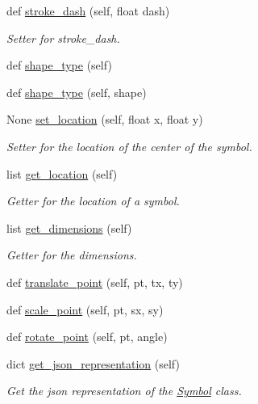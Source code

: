 \begin{DoxyCompactItemize}
def \mbox{\hyperlink{classbridges_1_1symbol_1_1_symbol_a78470b4fe73aea2cf7f5b7ad02eb2776}{stroke\+\_\+dash}} (self, float dash)
\begin{DoxyCompactList}\small\item\em Setter for stroke\+\_\+dash. \end{DoxyCompactList}\item 
def \mbox{\hyperlink{classbridges_1_1symbol_1_1_symbol_a86813f0f1a7ecbe5c52725730c887e75}{shape\+\_\+type}} (self)
\item 
def \mbox{\hyperlink{classbridges_1_1symbol_1_1_symbol_aea966b54a55c137ec15e849829fc9be9}{shape\+\_\+type}} (self, shape)
\item 
None \mbox{\hyperlink{classbridges_1_1symbol_1_1_symbol_a353bd462db1773ebe1e9a888f91d6ea5}{set\+\_\+location}} (self, float x, float y)
\begin{DoxyCompactList}\small\item\em Setter for the location of the center of the symbol. \end{DoxyCompactList}\item 
list \mbox{\hyperlink{classbridges_1_1symbol_1_1_symbol_ab7bf7c5d243838d4f018fae10fe88259}{get\+\_\+location}} (self)
\begin{DoxyCompactList}\small\item\em Getter for the location of a symbol. \end{DoxyCompactList}\item 
list \mbox{\hyperlink{classbridges_1_1symbol_1_1_symbol_a18aa1240a141ec2621322e37471eae30}{get\+\_\+dimensions}} (self)
\begin{DoxyCompactList}\small\item\em Getter for the dimensions. \end{DoxyCompactList}\item 
def \mbox{\hyperlink{classbridges_1_1symbol_1_1_symbol_a9600a66f48ad38baf42a2043db13334b}{translate\+\_\+point}} (self, pt, tx, ty)
\item 
def \mbox{\hyperlink{classbridges_1_1symbol_1_1_symbol_a963b55370096aa7314b03a2a34da2929}{scale\+\_\+point}} (self, pt, sx, sy)
\item 
def \mbox{\hyperlink{classbridges_1_1symbol_1_1_symbol_a81d55230ba4fec6c9a31d76cfc97bc96}{rotate\+\_\+point}} (self, pt, angle)
\item 
dict \mbox{\hyperlink{classbridges_1_1symbol_1_1_symbol_a891a710ff160439aa6dc476ce057f22e}{get\+\_\+json\+\_\+representation}} (self)
\begin{DoxyCompactList}\small\item\em Get the json representation of the \mbox{\hyperlink{classbridges_1_1symbol_1_1_symbol}{Symbol}} class. \end{DoxyCompactList}\end{DoxyCompactItemize}


